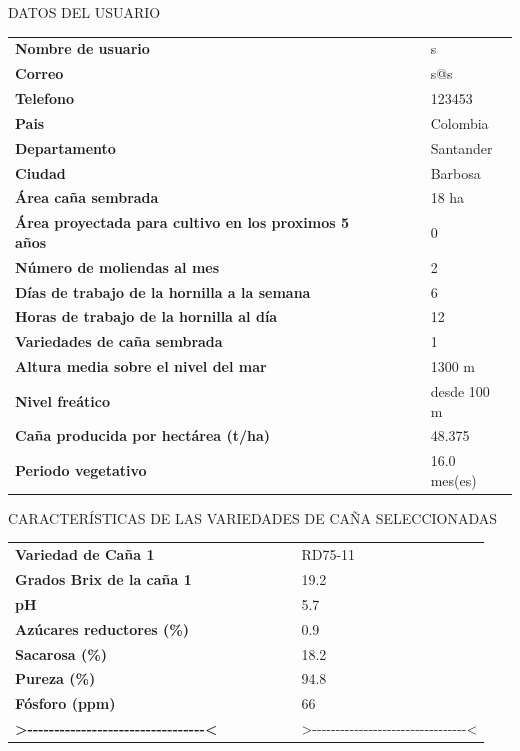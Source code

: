 \documentclass{article}%
\begin{document}
\newpage%
\begin{center}%
\begin{Huge}%
DATOS DEL USUARIO%
\end{Huge}%
\linebreak%
\end{center}%
\begin{tabular}{lccccl}%
\textbf{Nombre de usuario}& & & & &s\\%
\textbf{Correo}& & & & &s@s\\%
\textbf{Telefono}& & & & &123453\\%
\textbf{Pais}& & & & &Colombia\\%
\textbf{Departamento}& & & & &Santander\\%
\textbf{Ciudad}& & & & &Barbosa\\%
\textbf{Área caña sembrada}& & & & &18 ha\\%
\textbf{Área proyectada para cultivo en los proximos 5 años}& & & & &0\\%
\textbf{Número de moliendas al mes}& & & & &2\\%
\textbf{Días de trabajo de la hornilla a la semana}& & & & &6\\%
\textbf{Horas de trabajo de la hornilla al día}& & & & &12\\%
\textbf{Variedades de caña sembrada}& & & & &1\\%
\textbf{Altura media sobre el nivel del mar}& & & & &1300 m\\%
\textbf{Nivel freático}& & & & &desde 100 m\\%
\textbf{Caña producida por hectárea (t/ha)}& & & & &48.375\\%
\textbf{Periodo vegetativo}& & & & &16.0 mes(es)\\%
\end{tabular}%
\newpage%
\begin{center}%
\begin{Huge}%
CARACTERÍSTICAS DE LAS VARIEDADES DE CAÑA SELECCIONADAS%
\end{Huge}%
\linebreak%
\end{center}%
\begin{tabular}{lcccccl}%
\textbf{Variedad de Caña 1}& & & & & &RD75{-}11\\%
\textbf{Grados Brix de la caña 1}& & & & & &19.2\\%
\textbf{pH}& & & & & &5.7\\%
\textbf{Azúcares reductores (\%)}& & & & & &0.9\\%
\textbf{Sacarosa (\%)}& & & & & &18.2\\%
\textbf{Pureza (\%)}& & & & & &94.8\\%
\textbf{Fósforo (ppm)}& & & & & &66\\%
\textbf{>{-}{-}{-}{-}{-}{-}{-}{-}{-}{-}{-}{-}{-}{-}{-}{-}{-}{-}{-}{-}{-}{-}{-}{-}{-}{-}{-}{-}{-}{-}{-}{-}{-}<}& & & & & &>{-}{-}{-}{-}{-}{-}{-}{-}{-}{-}{-}{-}{-}{-}{-}{-}{-}{-}{-}{-}{-}{-}{-}{-}{-}{-}{-}{-}{-}{-}{-}{-}{-}<\\%
\end{tabular}%
\linebreak%
\newline%
%
\linebreak%
\end{document}
